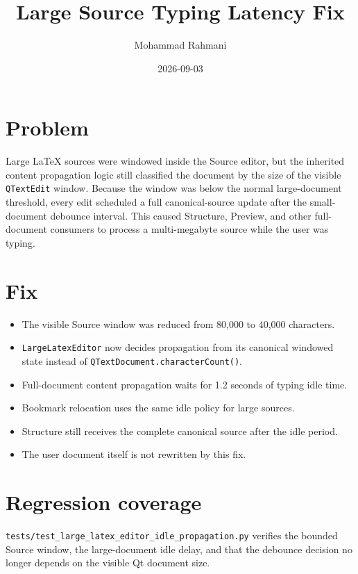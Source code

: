 \documentclass[a4paper]{article}
\title{Large Source Typing Latency Fix}
\date{2026-09-03}
\author{Mohammad Rahmani}
\begin{document}
   \maketitle

   \section{Problem}
   Large LaTeX sources were windowed inside the Source editor, but the inherited
   content propagation logic still classified the document by the size of the
   visible \texttt{QTextEdit} window. Because the window was below the normal
   large-document threshold, every edit scheduled a full canonical-source
   update after the small-document debounce interval. This caused Structure,
   Preview, and other full-document consumers to process a multi-megabyte
   source while the user was typing.

   \section{Fix}
   \begin{itemize}
      \item The visible Source window was reduced from 80,000 to 40,000 characters.
      \item \texttt{LargeLatexEditor} now decides propagation from its canonical
      windowed state instead of \texttt{QTextDocument.characterCount()}.
      \item Full-document content propagation waits for 1.2 seconds of typing idle time.
      \item Bookmark relocation uses the same idle policy for large sources.
      \item Structure still receives the complete canonical source after the idle period.
      \item The user document itself is not rewritten by this fix.
   \end{itemize}

   \section{Regression coverage}
   \texttt{tests/test\_large\_latex\_editor\_idle\_propagation.py} verifies the
   bounded Source window, the large-document idle delay, and that the debounce
   decision no longer depends on the visible Qt document size.

   
   
\end{document}
